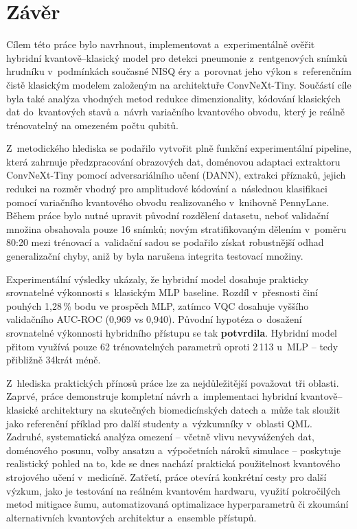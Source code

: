 \documentclass[12pt, a4paper]{report}
\begin{document}
\chapter{Závěr} \label{chap:zaver}

Cílem této práce bylo navrhnout, implementovat a~experimentálně ověřit hybridní kvantově–klasický model pro detekci pneumonie z~rentgenových snímků hrudníku v~podmínkách současné NISQ éry a~porovnat jeho výkon s~referenčním čistě klasickým modelem založeným na architektuře ConvNeXt-Tiny. Součástí cíle byla také analýza vhodných metod redukce dimenzionality, kódování klasických dat do~kvantových stavů a~návrh variačního kvantového obvodu, který je reálně trénovatelný na omezeném počtu qubitů. 

Z~metodického hlediska se podařilo vytvořit plně funkční experimentální pipeline, která zahrnuje předzpracování obrazových dat, doménovou adaptaci extraktoru ConvNeXt-Tiny pomocí adversariálního učení (DANN), extrakci příznaků, jejich redukci na rozměr vhodný pro amplitudové kódování a~následnou klasifikaci pomocí variačního kvantového obvodu realizovaného v~knihovně PennyLane. Během práce bylo nutné upravit původní rozdělení datasetu, neboť validační množina obsahovala pouze 16 snímků; novým stratifikovaným dělením v~poměru 80:20 mezi trénovací a~validační sadou se podařilo získat robustnější odhad generalizační chyby, aniž by byla narušena integrita testovací množiny.

Experimentální výsledky ukázaly, že hybridní model dosahuje prakticky srovnatelné výkonnosti s~klasickým MLP baseline. Rozdíl v~přesnosti činí pouhých 1{,}28\,\% bodu ve prospěch MLP, zatímco VQC dosahuje vyššího validačního AUC-ROC (0{,}969 vs 0{,}940). Původní hypotéza o~dosažení srovnatelné výkonnosti hybridního přístupu se tak \textbf{potvrdila}. Hybridní model přitom využívá pouze 62 trénovatelných parametrů oproti 2\,113 u~MLP -- tedy přibližně 34krát méně.

Z~hlediska praktických přínosů práce lze za nejdůležitější považovat tři oblasti. Zaprvé, práce demonstruje kompletní návrh a~implementaci hybridní kvantově–klasické architektury na skutečných biomedicínských datech a~může tak sloužit jako referenční příklad pro další studenty a~výzkumníky v~oblasti QML. Zadruhé, systematická analýza omezení -- včetně vlivu nevyvážených dat, doménového posunu, volby ansatzu a~výpočetních nároků simulace -- poskytuje realistický pohled na to, kde se dnes nachází praktická použitelnost kvantového strojového učení v~medicíně. Zatřetí, práce otevírá konkrétní cesty pro další výzkum, jako je testování na reálném kvantovém hardwaru, využití pokročilých metod mitigace šumu, automatizovaná optimalizace hyperparametrů či zkoumání alternativních kvantových architektur a~ensemble přístupů.
\end{document}
